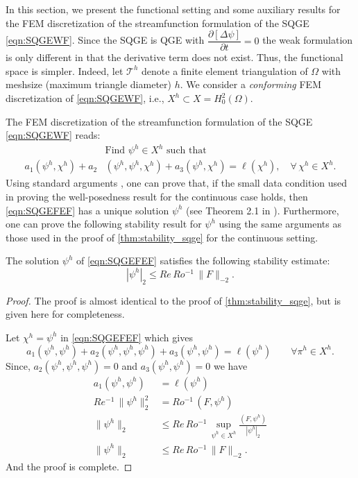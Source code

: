 In this section, we present the functional setting and some auxiliary results for the FEM
discretization of the streamfunction formulation of the SQGE \eqref{eqn:SQGEWF}. Since the SQGE is
QGE with $\dfrac{\partial [\Delta \psi]}{\partial t} = 0$ the weak formulation is only different in
that the derivative term does not exist. Thus, the functional space is simpler. Indeed,
let $\mathcal{T}^h$ denote a finite element triangulation of $\Omega$ with meshsize (maximum
triangle diameter) $h$. We consider a \emph{conforming} FEM discretization of \eqref{eqn:SQGEWF},
i.e., $X^h \subset X = H_0^2(\Omega)$.

The FEM discretization of the streamfunction formulation of the SQGE \eqref{eqn:SQGEWF} reads: 
\begin{equation}
  \begin{split}
    &\text{Find } \psi^h \in X^h \text{ such that} \\ 
    a_1(\psi^h,\chi^h) + a_2&(\psi^h,\psi^h,\chi^h)
      + a_3(\psi^h,\chi^h) = \ell(\chi^h),\quad \forall \, \chi^h \in X^h.
    \label{eqn:SQGEFEF}
  \end{split}
\end{equation}
Using standard arguments \cite{Girault79,Girault86}, one can prove that, if the small data condition
used in proving the well-posedness result for the continuous case holds, then \eqref{eqn:SQGEFEF}
has a unique solution $\psi^h$ (see Theorem 2.1 in \cite{Cayco86}). Furthermore, one can prove the
following stability result for $\psi^h$ using the same arguments as those used in the proof of
\eqref{thm:stability_sqge} for the continuous setting.  
\begin{theorem} \label{thm:stability_fem_sqge} The
  solution $\psi^h$ of \eqref{eqn:SQGEFEF} satisfies the following stability estimate:
 \begin{equation}
   |\psi^h|_2 \le Re \, Ro^{-1} \, \| F \|_{-2} . 
   \label{eqn:stability_fem_sqge}
 \end{equation}
\end{theorem}
\begin{proof}
  The proof is almost identical to the proof of \autoref{thm:stability_sqge}, but is given here for
  completeness.

  Let $\chi^h = \psi^h$ in \eqref{eqn:SQGEFEF} which gives
  \begin{equation*}
    a_1(\psi^h,\psi^h) + a_2(\psi^h,\psi^h,\psi^h) + a_3(\psi^h,\psi^h) = \ell(\psi^h)\qquad  \forall
    \pi^h \in X^h. 
  \end{equation*}
  Since, $a_2(\psi^h, \psi^h, \psi^h) =0$ and $a_3(\psi^h,\psi^h)=0$ we have 
  \begin{align*}
    a_1(\psi^h,\psi^h) &= \ell(\psi^h) \\
    Re^{-1}\, \|\psi^h\|_2^2 &= Ro^{-1}\, (F,\psi^h) \\
    \|\psi^h\|_2 &\le Re\, Ro^{-1}\,\sup_{\psi^h \in X^h} \frac{(F,\psi^h)}{|\psi^h|_2} \\
    \|\psi^h\|_2 &\le Re\, Ro^{-1}\, \|F\|_{-2}.
  \end{align*}
  And the proof is complete.
\end{proof}

